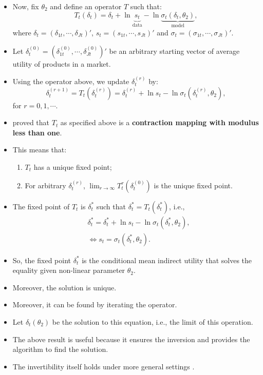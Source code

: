 \documentclass[
]{book}
\providecommand{\tightlist}{%
  \setlength{\itemsep}{0pt}\setlength{\parskip}{0pt}}
\begin{document}
\begin{itemize}
\tightlist
\item
  Now, fix \(\theta_2\) and define an operator \(T\) such that:
  \begin{equation}
  T_t(\delta_t) = \delta_t + \ln \underbrace{s_{t}}_{\text{data}} - \ln \underbrace{\sigma_{t}(\delta_t, \theta_2)}_{\text{model}},
  \end{equation}
  where \(\delta_t = (\delta_{1t}, \cdots, \delta_{Jt})'\), \(s_t = (s_{1t}, \cdots, s_{Jt})'\) and \(\sigma_t = (\sigma_{1t}, \cdots, \sigma_{Jt})'\).
\item
  Let \(\delta_t^{(0)} = (\delta_{1t}^{(0)}, \cdots, \delta_{Jt}^{(0)})'\) be an arbitrary starting vector of average utility of products in a market.
\item
  Using the operator above, we update \(\delta_{t}^{(r)}\) by:
  \begin{equation}
  \delta_{t}^{(r + 1)} = T_t(\delta_{t}^{(r)}) = \delta_t^{(r)} + \ln s_{t} - \ln \sigma_{t}(\delta_t^{(r)}, \theta_2),
  \end{equation}
  for \(r = 0, 1, \cdots\).
\item
  \citet{berryAutomobilePricesMarket1995} proved that \(T_t\) as specified above is a \textbf{contraction mapping with modulus less than one}.
\item
  This means that:

  \begin{enumerate}
  \def\labelenumi{\arabic{enumi}.}
  \tightlist
  \item
    \(T_t\) has a unique fixed point;
  \item
    For arbitrary \(\delta_t^{(r)}\), \(\lim_{r \to \infty} T_t^r(\delta_t^{(0)})\) is the unique fixed point.
  \end{enumerate}
\item
  The fixed point of \(T_t\) is \(\delta_t^*\) such that \(\delta_t^* = T_t(\delta_t^*)\), i.e.,
  \begin{equation}
  \begin{split}
  &\delta_t^* = \delta_t^* + \ln s_{t} - \ln \sigma_{t}(\delta_t^*, \theta_2),\\
  &\Leftrightarrow s_{t} = \sigma_{t}(\delta_t^*, \theta_2).
  \end{split}
  \end{equation}
\item
  So, the fixed point \(\delta_t^*\) is the conditional mean indirect utility that solves the equality given non-linear parameter \(\theta_2\).
\item
  Moreover, the solution is unique.
\item
  Moreover, it can be found by iterating the operator.
\item
  Let \(\delta_t(\theta_2)\) be the solution to this equation, i.e., the limit of this operation.
\item
  The above result is useful because it ensures the inversion and provides the algorithm to find the solution.
\item
  The invertibility itself holds under more general settings \citep{Berry2013}.
\end{itemize}
\end{document}
